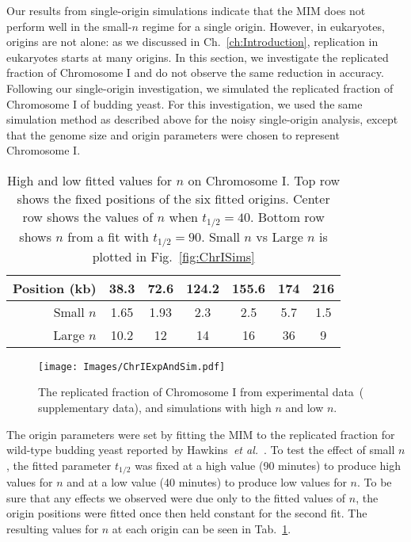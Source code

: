 	Our results from single-origin simulations indicate that the MIM does not perform well in the small-$n$ regime for a single origin.
	However, in eukaryotes, origins are not alone: as we discussed in Ch.~\ref{ch:Introduction}, replication in eukaryotes starts at many origins.
	In this section, we investigate the replicated fraction of Chromosome I and do not observe the same reduction in accuracy.
	Following our single-origin investigation, we simulated the replicated fraction of Chromosome I of budding yeast.
	For this investigation, we used the same simulation method as described above for the noisy single-origin analysis, except that the genome size and origin parameters were chosen to represent Chromosome I.
	
	\begin{table}[tbh]
		\begin{center}
			\begin{tabular}{| r | c | c | c | c | c | c |}	
				\hline
				Position (kb)	&	38.3	&	72.6	&	124.2	&	155.6	&	174	&	216	\\	\hline
				Small $n$	&	1.65	&	1.93	&	2.3	&	2.5	&	5.7	&	1.5	\\
				Large $n$	&	10.2	&	12	&	14	&	16	&	36	&	9	\\	\hline
			\end{tabular}
		\end{center}
		
		\caption[High and low $n$ fit values for Chromosome I]{\label{tab:LargeAndSmallN}
			High and low fitted values for $n$ on Chromosome I.
			Top row shows the fixed positions of the six fitted origins.
			Center row shows the values of $n$ when $t_{1/2}=40$.
			Bottom row shows $n$ from a fit with $t_{1/2}=90$.
			Small $n$ vs Large $n$ is plotted in Fig.~\ref{fig:ChrISims}
		}
	\end{table}
		
	\begin{figure}[tbh]
		\begin{center}
			\texttt{[image: Images/ChrIExpAndSim.pdf]}
		\end{center}
			\caption[Experimental and Simulated Replicated Fraction of Chromosome I]{\label{fig:ThisFigure} 
				The replicated fraction of Chromosome I from experimental data~(\cite{StochasticTermination} supplementary data), and simulations with high $n$ and low $n$.
			}
	\end{figure} 

	The origin parameters were set by fitting the MIM to the replicated fraction for wild-type budding yeast reported by Hawkins~\emph{et al.}~\cite{StochasticTermination}.
	To test the effect of small $n$, the fitted parameter $t_{1/2}$ was fixed at a high value (90 minutes) to produce high values for $n$ and at a low value (40 minutes) to produce low values for $n$.
	To be sure that any effects we observed were due only to the fitted values of $n$, the origin positions were fitted once then held constant for the second fit.
	The resulting values for $n$ at each origin can be seen in Tab.~\ref{tab:LargeAndSmallN}.
		
